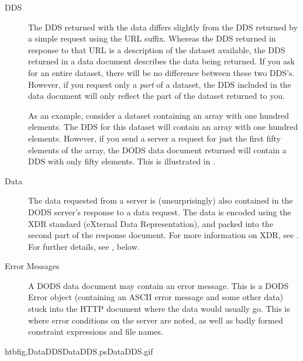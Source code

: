 \begin{description}
\item[DDS] 

  The DDS returned with the data differs slightly from the DDS
  returned by a simple request using the  URL suffix.
  Whereas the DDS returned in response to that URL is a description of
  the dataset available, the DDS returned in a data document describes
  the data being returned.  If you ask for an entire dataset, there
  will be no difference between these two DDS's.  However, if you
  request only a \emph{part} of a dataset, the DDS included in the
  data document will only reflect the part of the dataset returned to
  you. 

  As an example, consider a dataset containing an array with one
  hundred elements.  The DDS for this dataset will contain an array
  with one hundred elements.  However, if you send a server a request
  for just the first fifty elements of the array, the DODS data
  document returned will contain a DDS with only fifty elements.  This
  is illustrated in . 

\item[Data] 

  The data requested from a server is (unsurprisingly) also contained
  in the DODS server's response to a data request.  The data is
  encoded using the XDR standard (eXternal Data Representation), and
  packed into the second part of the response document.  For more
  information on XDR, see .  For further details,
  see , below.

\item[Error Messages] 
  
  A DODS data document may contain an error message.  This is a DODS
  Error object (containing an ASCII error message and some other data)
  stuck into the HTTP document where the data would usually go.  This
  is where error conditions on the server are noted, as well as badly
  formed constraint expressions and file names.

\end{description}


  {htb}{fig,DataDDS}{DataDDS.ps}{DataDDS.gif}{}


